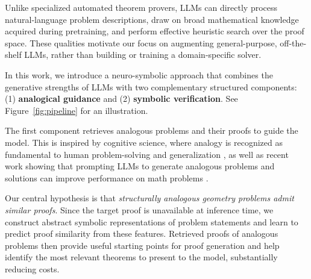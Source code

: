 Unlike specialized automated theorem provers, LLMs can directly process natural-language problem descriptions, draw on broad mathematical knowledge acquired during pretraining, and perform effective heuristic search over the proof space. These qualities motivate our focus on augmenting general-purpose, off-the-shelf LLMs, rather than building or training a domain-specific solver.













In this work, we introduce a neuro-symbolic approach that combines the generative strengths of LLMs with two complementary structured components: (1) \textbf{analogical guidance} and (2) \textbf{symbolic verification}. See Figure~\ref{fig:pipeline} for an illustration.

The first component retrieves analogous problems and their proofs to guide the model. This is inspired by cognitive science, where analogy is recognized as fundamental to human problem-solving and generalization \cite{gentner1983structure, holyoak1996mental}, as well as recent work showing that prompting LLMs to generate analogous problems and solutions can improve performance on math problems \cite{yasunaga2023large}.

Our central hypothesis is that \emph{structurally analogous geometry problems admit similar proofs}. Since the target proof is unavailable at inference time, we construct abstract symbolic representations of problem statements and learn to predict proof similarity from these features. Retrieved proofs of analogous problems then provide useful starting points for proof generation and help identify the most relevant theorems to present to the model, substantially reducing costs.


